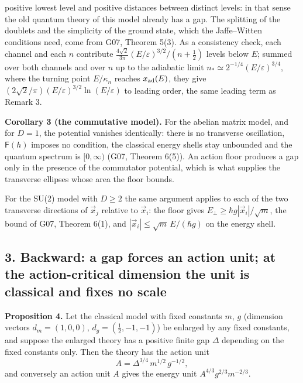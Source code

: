 \documentclass[11pt,a4paper]{article}
\begin{document}
\begin{enumerate}
  positive lowest level and positive distances between distinct levels:
  in that sense the old quantum theory of this model already has a gap.
  The splitting of the doublets and the simplicity of the ground state,
  which the Jaffe--Witten conditions need, come from G07, Theorem 5(3).
  As a consistency check, each channel and each \(n\) contribute
  \(\frac{4\sqrt2}{3\pi}(E/\varepsilon)^{3/2}/(n+\tfrac12)\) levels
  below \(E\); summed over both channels and over \(n\) up to the
  adiabatic limit \(n_*\simeq2^{-1/4}(E/\varepsilon)^{3/4}\), where the
  turning point \(E/\kappa_n\) reaches \(x_{\rm ad}(E)\), they give
  \((2\sqrt2/\pi)(E/\varepsilon)^{3/2}\ln(E/\varepsilon)\) to leading
  order, the same leading term as Remark 3.
\end{enumerate}

\textbf{Corollary 3 (the commutative model).} For the abelian matrix
model, and for \(D=1\), the potential vanishes identically: there is no
transverse oscillation, \(\mathsf F(h)\) imposes no condition, the
classical energy shells stay unbounded and the quantum spectrum is
\([0,\infty)\) (G07, Theorem 6(5)). An action floor produces a gap only
in the presence of the commutator potential, which is what supplies the
transverse ellipses whose area the floor bounds.

For the SU(2) model with \(D\ge2\) the same argument applies to each of
the two transverse directions of \(\vec x_j\) relative to \(\vec x_i\):
the floor gives \(E_\perp\ge\hbar g|\vec x_i|/\sqrt m\), the bound of
G07, Theorem 6(1), and \(|\vec x_i|\le\sqrt m\,E/(\hbar g)\) on the
energy shell.

\subsection{3. Backward: a gap forces an action unit; at the
action-critical dimension the unit is classical and fixes no
scale}\label{backward-a-gap-forces-an-action-unit-at-the-action-critical-dimension-the-unit-is-classical-and-fixes-no-scale}

\textbf{Proposition 4.} Let the classical model with fixed constants
\(m\), \(g\) (dimension vectors \(d_m=(1,0,0)\),
\(d_g=(\tfrac12,-1,-1)\)) be enlarged by any fixed constants, and
suppose the enlarged theory has a positive finite gap \(\Delta\)
depending on the fixed constants only. Then the theory has the action
unit \[A=\Delta^{3/4}\,m^{1/2}\,g^{-1/2},\] and conversely an action
unit \(A\) gives the energy unit \(A^{4/3}g^{2/3}m^{-2/3}\).
\end{document}
